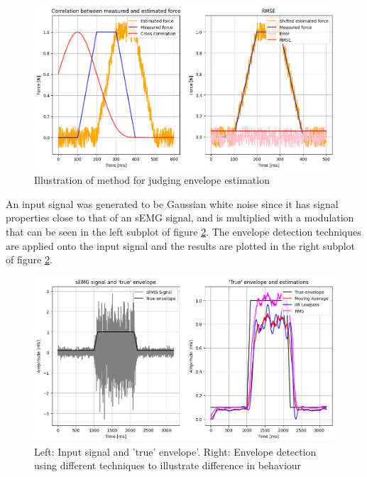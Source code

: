 \begin{figure}[h!t]
	\begin{center}
		\includegraphics[width=1.0\columnwidth]{images/envelope_estimation_method.png}
	\end{center}
	\caption{Illustration of method for judging envelope estimation}
	\label{fig:envelope_estimation_method}
\end{figure}

An input signal was generated to be Gaussian white noise since it has signal properties close to that of an sEMG signal, and is multiplied with a modulation that can be seen in the left subplot of figure \ref{fig:envelope_detection}. The envelope detection techniques are applied onto the input signal and the results are plotted in the right subplot of figure \ref{fig:envelope_detection}.

\begin{figure}[h!t]
	\begin{center}
		\includegraphics[width=1.0\columnwidth]{images/envelope_detection.png}
	\end{center}
	\caption{Left: Input signal and 'true' envelope'. Right: Envelope detection using different techniques to illustrate difference in behaviour}
	\label{fig:envelope_detection}
\end{figure}

